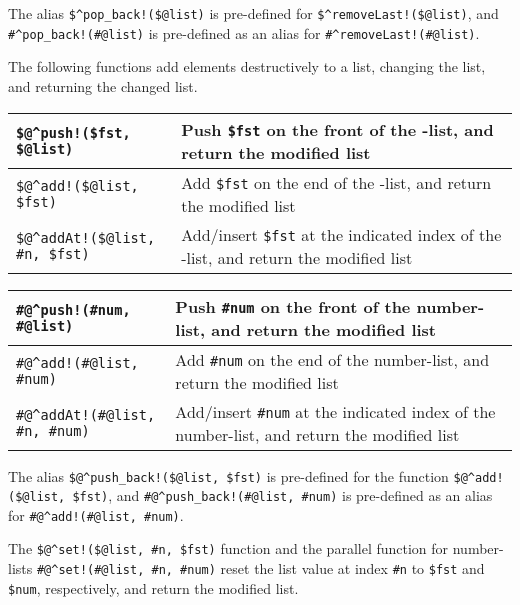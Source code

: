 \vspace{.5cm}

The alias \verb+$^pop_back!($@list)+ is pre-defined for
\verb+$^removeLast!($@list)+, and  \verb+#^pop_back!(#@list)+ is
pre-defined as an alias for \verb+#^removeLast!(#@list)+.

The following functions add elements destructively to a list, changing
the list, and returning the changed list.

\vspace{.5cm}

\noindent
\begin{tabular}{|l|p{6.5cm}|}
\hline
\verb+$@^push!($fst, $@list)+ & Push \verb!$fst! on the front of the
\fsm{}-list, and return the
modified list\\
\hline
\verb+$@^add!($@list, $fst)+ & Add \verb!$fst! on the end of the \fsm{}-list, and return the modified
list\\
\hline
\verb+$@^addAt!($@list, #n, $fst)+ & Add/insert \verb!$fst! at the indicated index of
the \fsm{}-list, and return the
modified list\\
\hline
\end{tabular}

\vspace{.5cm}

\noindent
\begin{tabular}{|l|p{6.5cm}|}
\hline
\verb+#@^push!(#num, #@list)+ & Push \verb!#num! on the front of the number-list, and return the
modified list\\
\hline
\verb+#@^add!(#@list, #num)+ & Add \verb!#num! on the end of the number-list, and return the modified
list\\
\hline
\verb+#@^addAt!(#@list, #n, #num)+ & Add/insert \verb!#num! at the indicated index of
the number-list, and return the
modified list\\
\hline
\end{tabular}

\vspace{.5cm}

The alias \verb+$@^push_back!($@list, $fst)+ is pre-defined for the function
\verb+$@^add!($@list, $fst)+, and \verb+#@^push_back!(#@list, #num)+ is pre-defined as an
alias for \verb+#@^add!(#@list, #num)+.

The \verb+$@^set!($@list, #n, $fst)+ function and the parallel function for
number-lists
\verb+#@^set!(#@list, #n, #num)+ reset the list value at index
\verb!#n! to \verb!$fst! and \verb!$num!, respectively, and return the modified list.

